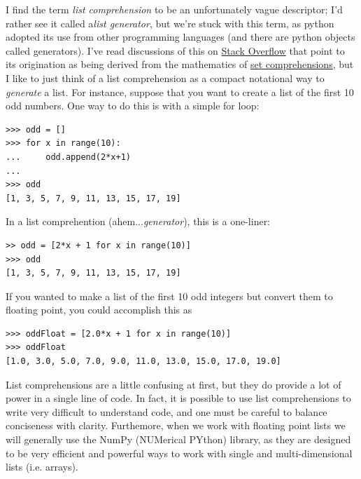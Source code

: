 I find the term \textit{list comprehension} to be an unfortunately vague descriptor; I'd rather see it called a\textit{list generator}, 
but we're stuck with this term, as python adopted its use from other programming languages (and there are python objects called generators). I've read discussions of this on \href{http://stackoverflow.com/questions/1903980/why-list-comprehension-is-called-so-in-python}{Stack Overflow} that point to its origination as being derived from the mathematics of \href{http://en.wikipedia.org/wiki/Set-builder\%5Fnotation}{set comprehensions}, but I like to just think of a list comprehension as a compact notational way to \textit{generate} a list. For instance, suppose that you want to create a list of the first 10 odd numbers. One way to do this is with a simple for loop:
\begin{lstlisting}[frame=none]
>>> odd = []
>>> for x in range(10):
...     odd.append(2*x+1)
...
>>> odd
[1, 3, 5, 7, 9, 11, 13, 15, 17, 19]
\end{lstlisting}
In a list comprehention (ahem...\textit{generator}), this is a one-liner:
\begin{lstlisting}[frame=none]
>> odd = [2*x + 1 for x in range(10)]
>>> odd
[1, 3, 5, 7, 9, 11, 13, 15, 17, 19]
\end{lstlisting}
If you wanted to make a list of the first 10 odd integers but convert them to floating point, you could accomplish this as
\begin{lstlisting}[frame=none]
>>> oddFloat = [2.0*x + 1 for x in range(10)]
>>> oddFloat
[1.0, 3.0, 5.0, 7.0, 9.0, 11.0, 13.0, 15.0, 17.0, 19.0]
\end{lstlisting}
List comprehensions are a little confusing at first, but they do provide a lot of power in a single line of code. In fact, it is possible to use list comprehensions to write very difficult to understand code, and one must be careful to balance conciseness with clarity. Furthemore, when we work with floating point lists we will generally use the NumPy (NUMerical PYthon) library, as they are designed to be very efficient and powerful ways to work with single and multi-dimensional lists (i.e. arrays). 

